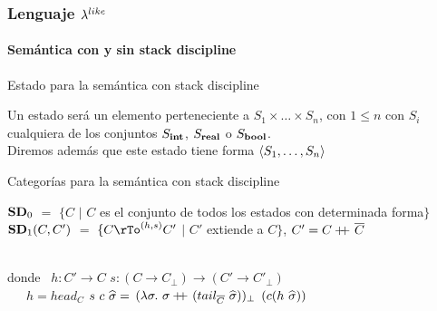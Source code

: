\documentclass{beamer}
\begin{document}
\begin{frame}
\frametitle{Lenguaje $\lambda^{like}$}
\framesubtitle{Semántica con y sin stack discipline}

\begin{block}{Estado para la semántica con stack discipline}

Un estado será un elemento perteneciente a $S_1 \times \ldots \times S_n$, 
con $1 \leq n$ con $S_i$ cualquiera de los conjuntos $S_{\textbf{int}}$, $S_{\textbf{real}}$ o $S_{\textbf{bool}}$.\\
Diremos además que este estado tiene forma $\langle S_1,\ldots,S_n \rangle$

\end{block}

\pause

\begin{block}{Categorías para la semántica con stack discipline}

$\textbf{SD}_0$ $=$ $\{C$ $|$ $C$ es el conjunto de todos los estados con determinada forma$\}$\\
$\textbf{SD}_1(C,C')$ $=$ $\{C \rTo^{(h,s)} C'$ $|$ $C'$ extiende a $C\}$, $C' = C +\kern-1.3ex+\kern0.8ex \overline{C}$\\

\

donde \ $h: C' \rightarrow C$
\quad \quad \quad
	  $s: (C \rightarrow C_{\bot}) \rightarrow (C' \rightarrow C'_{\bot})$\\
\quad \quad \ \ \ 
	  $h = head_C$
\quad \quad \quad 
	  $s \ c \ \widehat{\sigma} =$ 
	  	   $(\lambda \sigma. \ \sigma +\kern-1.3ex+\kern0.8ex (tail_{\overline{C}} \ \widehat{\sigma}))_{\bot}$
	  	   	$(c(h \ \widehat{\sigma}))$\\
\end{block}

\end{frame}
\end{document}
